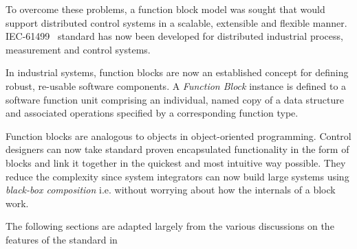 To overcome these problems, a function block model was sought that
would support distributed control systems in a scalable,
extensible and flexible manner. IEC-61499~\cite{iec:61499:2000}
standard has now been developed for distributed industrial
process, measurement and control systems.

In industrial systems, function blocks are now an established
concept for defining robust, re-usable software components. A {\it
Function Block} instance is defined to a software function unit
comprising an individual, named copy of a data structure and
associated operations specified by a corresponding function type.

Function blocks are analogous to objects in object-oriented
programming. Control designers can now take standard proven
encapsulated functionality in the form of blocks and link it
together in the quickest and most intuitive way possible. They
reduce the complexity since system integrators can now build large
systems using {\it black-box composition} i.e. without worrying
about how the internals of a block work.

The following sections are adapted largely from the various
discussions on the features of the standard in ~\cite{iec:61499:2000,
iec:1131:1993, l:pro:1995, l:mod:2001, c:des:2002, c:ope:2002}

